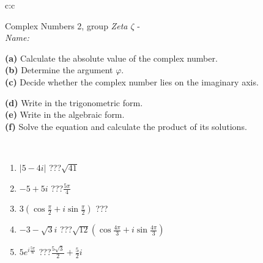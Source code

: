 \documentclass[10pt]{report}
\begin{document}
\newpage
\thispagestyle{empty}
\begin{tabular}{c:c}
\begin{minipage}[c][104.5mm][t]{0.5\linewidth}
\begin{center}
\vspace{5mm}
{\huge Complex Numbers 2, group \textit{Zeta $\zeta$} -}\\[5mm]
\textit{Name:}\phantom{xxxxxxxxxxxxxxxxxxxxxxxxxxxxxxxxxxxxxxxxxxxxxxxxxxxxxxxxxxxxxxxxx}\\[5mm]
\begin{minipage}{0.95\linewidth}
\begin{center}
{\small \begin{minipage}{0.44\textwidth} \raggedright
\textbf{(a)} Calculate the absolute value of the complex number. \\[1mm]
\textbf{(b)} Determine the argument \(\varphi\). \\[1mm]
\textbf{(c)} Decide whether the complex number lies on the imaginary axis. \end{minipage} \begin{minipage}{0.54\textwidth}
\textbf{(d)} Write in the trigonometric form. \\[1mm]
\textbf{(e)} Write in the algebraic form. \\[1mm]
\textbf{(f)} Solve the equation and calculate the product of its solutions.
\end{minipage}
}
\end{center}
\end{minipage}
\\[1mm]
\begin{minipage}{0.79\linewidth}
\begin{center}
\begin{varwidth}{\linewidth}
\setlength{\itemsep}{0pt}
\begin{enumerate}
\large
\item $|5-4i|$\quad \dotfill\; ???\;\dotfill \quad $\sqrt{41}$
\item $-5+5i$\quad \dotfill\; ???\;\dotfill \quad $\frac{5\pi}{4}$
\item $3\left(\cos{\frac{\pi}{2}}+i\sin{\frac{\pi}{2}}\right)$\quad \dotfill\; ???\;\dotfill \quad {}
\item $-3-\sqrt{3}i$\quad \dotfill\; ???\;\dotfill \quad $\sqrt{12}\left(\cos{\frac{4\pi}{3}}+i\sin{\frac{4\pi}{3}}\right)$
\item $5e^{i\frac{5\pi}{6}}$\quad \dotfill\; ???\;\dotfill \quad $\frac{5\sqrt{3}}{2}+\frac{5}{2}i$

\end{enumerate}
\end{varwidth}
\end{center}
\end{minipage}
\end{center}
\end{minipage}
\end{tabular}
\end{document}
